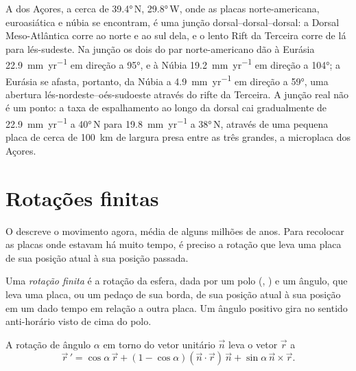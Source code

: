 A  dos Açores, a cerca de \ang{39.4}\,N, \ang{29.8}\,W, onde as
placas norte-americana, euroasiática e núbia se encontram, é uma junção dorsal--dorsal--dorsal:
a Dorsal Meso-Atlântica corre ao norte e ao sul dela, e o lento
Rift da Terceira corre de lá para lés-sudeste. Na junção os dois 
do par norte-americano dão à Eurásia \qty{22.9}{mm.yr^{-1}} em direção a
\ang{95}, e à Núbia \qty{19.2}{mm.yr^{-1}} em direção a \ang{104}; a Eurásia se afasta, portanto,
da Núbia a \qty{4.9}{mm.yr^{-1}} em direção a \ang{59}, uma
abertura lés-nordeste--oés-sudoeste através do rifte da Terceira. A junção real
não é um ponto: a taxa de espalhamento ao longo da dorsal cai gradualmente
de \qty{22.9}{mm.yr^{-1}} a \ang{40}\,N para \qty{19.8}{mm.yr^{-1}} a
\ang{38}\,N, através de uma pequena placa de cerca de \qty{100}{km} de largura presa entre as
três grandes, a microplaca dos Açores.

\section{Rotações finitas}

O  descreve o movimento agora, média de alguns milhões de anos.
Para recolocar as placas onde estavam há muito tempo, é preciso a rotação que
leva uma placa de sua posição atual à sua posição passada.

\begin{definition}\label{def:b1:plate-kinematics:finite-rotation}
Uma \emph{rotação finita} é a rotação da esfera,
dada por um polo (, ) e um ângulo, que leva uma placa, ou um
pedaço de sua borda, de sua posição atual à sua posição em um dado tempo
em relação a outra placa. Um ângulo positivo gira no sentido anti-horário visto de cima
do polo.
\end{definition}

\begin{proposition}\label{prop:b1:plate-kinematics:rodrigues}
A rotação de ângulo $\alpha$ em torno do vetor unitário $\vec n$ leva o
vetor $\vec r$ a
\[
  \vec r\,' = \cos\alpha\,\vec r + (1 - \cos\alpha)(\vec n\cdot\vec r)\,\vec n
  + \sin\alpha\,\vec n\times\vec r .
\]
\end{proposition}

